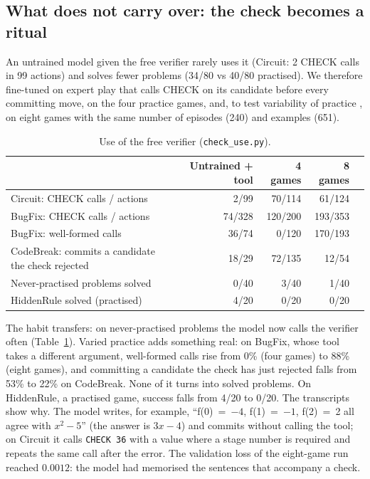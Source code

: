 \documentclass[11pt]{article}
\begin{document}
\subsection{What does not carry over: the check becomes a ritual}\label{sec:ritual}
An untrained model given the free verifier rarely uses it (Circuit: 2 CHECK calls in 99 actions) and solves fewer
problems (34/80 vs 40/80 practised). We therefore fine-tuned on expert play that calls CHECK on its candidate before
every committing move, on the four practice games, and, to test variability of practice \citep{schmidt1975}, on
eight games with the same number of episodes (240) and examples (651).

\begin{table}[h]
\centering\small
\begin{tabular}{lrrrr}
\toprule
 & Untrained + tool & 4 games & 8 games \\
\midrule
Circuit: CHECK calls / actions & 2/99 & 70/114 & 61/124 \\
BugFix: CHECK calls / actions & 74/328 & 120/200 & 193/353 \\
BugFix: well-formed calls & 36/74 & 0/120 & 170/193 \\
CodeBreak: commits a candidate the check rejected & 18/29 & 72/135 & 12/54 \\
Never-practised problems solved & 0/40 & 3/40 & 1/40 \\
HiddenRule solved (practised) & 4/20 & 0/20 & 0/20 \\
\bottomrule
\end{tabular}
\caption{Use of the free verifier (\texttt{check\_use.py}).}
\label{tab:check}
\end{table}

The habit transfers: on never-practised problems the model now calls the verifier often (Table~\ref{tab:check}).
Varied practice adds something real: on BugFix, whose tool takes a different argument, well-formed calls rise from
0\% (four games) to 88\% (eight games), and committing a candidate the check has just rejected falls from 53\% to
22\% on CodeBreak. None of it turns into solved problems. On HiddenRule, a practised game, success falls from 4/20
to 0/20. The transcripts show why. The model writes, for example, ``f(0)~=~$-4$, f(1)~=~$-1$, f(2)~=~2 all agree
with $x^2-5$'' (the answer is $3x-4$) and commits without calling the tool; on Circuit it calls \texttt{CHECK 36}
with a value where a stage number is required and repeats the same call after the error. The validation loss of the
eight-game run reached $0.0012$: the model had memorised the sentences that accompany a check.
\end{document}
